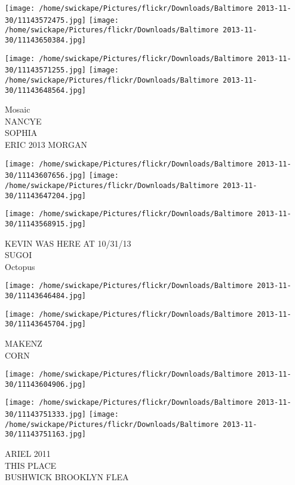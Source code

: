 \documentclass[10pt,letterpaper]{article}
\begin{document}
\texttt{[image: /home/swickape/Pictures/flickr/Downloads/Baltimore 2013-11-30/11143572475.jpg]}
\texttt{[image: /home/swickape/Pictures/flickr/Downloads/Baltimore 2013-11-30/11143650384.jpg]}

\texttt{[image: /home/swickape/Pictures/flickr/Downloads/Baltimore 2013-11-30/11143571255.jpg]}
\texttt{[image: /home/swickape/Pictures/flickr/Downloads/Baltimore 2013-11-30/11143648564.jpg]}

Mosaic\\
NANCYE\\
SOPHIA\\
ERIC 2013 MORGAN\\
\pagebreak

\texttt{[image: /home/swickape/Pictures/flickr/Downloads/Baltimore 2013-11-30/11143607656.jpg]}
\texttt{[image: /home/swickape/Pictures/flickr/Downloads/Baltimore 2013-11-30/11143647204.jpg]}

\texttt{[image: /home/swickape/Pictures/flickr/Downloads/Baltimore 2013-11-30/11143568915.jpg]}

KEVIN WAS HERE AT 10/31/13\\
SUGOI\\
Octopus\\
\pagebreak

\texttt{[image: /home/swickape/Pictures/flickr/Downloads/Baltimore 2013-11-30/11143646484.jpg]}

\vspace{0.25in}
\texttt{[image: /home/swickape/Pictures/flickr/Downloads/Baltimore 2013-11-30/11143645704.jpg]}

MAKENZ\\
CORN\\
\pagebreak

\texttt{[image: /home/swickape/Pictures/flickr/Downloads/Baltimore 2013-11-30/11143604906.jpg]}

\vspace{0.25in}
\texttt{[image: /home/swickape/Pictures/flickr/Downloads/Baltimore 2013-11-30/11143751333.jpg]}
\texttt{[image: /home/swickape/Pictures/flickr/Downloads/Baltimore 2013-11-30/11143751163.jpg]}

ARIEL 2011\\
THIS PLACE\\
BUSHWICK BROOKLYN FLEA\\
\pagebreak
\end{document}

